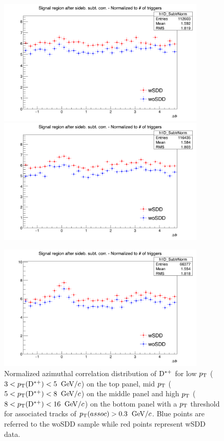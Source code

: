 \begin{figure}[!h]
\centering
\includegraphics[width=0.8\linewidth, height=6cm]{figures/wSDD_vs_woSDD/AzimCorrDistr_Dstar_Canvas_PtIntBins2to3_PoolInt_thr0dot3to99dot0_Superimp.png}
\includegraphics[width=0.8\linewidth, height=6cm]{figures/wSDD_vs_woSDD/AzimCorrDistr_Dstar_Canvas_PtIntBins4to6_PoolInt_thr0dot3to99dot0_Superimp.png}

\includegraphics[width=0.8\linewidth, height=6cm]{figures/wSDD_vs_woSDD/AzimCorrDistr_Dstar_Canvas_PtIntBins7to9_PoolInt_thr0dot3to99dot0_Superimp.png}
\caption{Normalized azimuthal correlation distribution of ${\rm D^{*+}}$ for low $p_{\rm T}$ ($3 < p_{\rm T}({\rm D^{*+}}) < 5$ $\mathrm{GeV}/c$) on the top panel, mid $p_{\rm T}$ ($5 < p_{\rm T}({\rm D^{*+}}) < 8$ $\mathrm{GeV}/c$) on the middle panel and high $p_{\rm T}$ ($8 < p_{\rm T}({\rm D^{*+}}) < 16$ $\mathrm{GeV}/c$) on the bottom panel with a $p_{\rm T}$ threshold for associated tracks of $p_{\rm T}(assoc) > 0.3$ $\mathrm{GeV}/c$. Blue points are referred to the woSDD sample while red points represent wSDD data.}
\label{wSSvswoSDD}
\end{figure}

